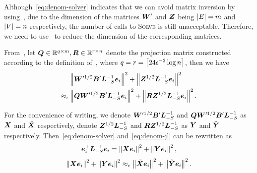 \documentclass[sigconf]{acmart}
\begin{document}
Although~\eqref{eq:denom-solver} indicates that we can avoid matrix inversion by using~, due to the dimension of the matrices \(\boldsymbol{W}'\) and \(\boldsymbol{Z}\) being \(\left|E \right|=m\) and \(\left|V \right|=n\) respectively, the number of calls to \textsc{Solve} is still unacceptable.
Therefore, we need to use~ to reduce the dimension of the corresponding matrices.

From~, let \(\boldsymbol{Q}\in\mathbb{R}^{q\times m},\boldsymbol{R}\in\mathbb{R}^{r\times n}\) denote the projection matrix constructed according to the definition of~, where \(q=r=\left\lceil24\epsilon^{-2}\log n\right\rceil\), then we have
\begin{equation}\label{eq:denom-jl}
  \begin{split}
    &\left\Vert\boldsymbol{W}'^{1/2}\boldsymbol{B}'\boldsymbol{L}_{-S}^{-1}\boldsymbol{e}_i\right\Vert^2+\left\Vert\boldsymbol{Z}^{1/2}\boldsymbol{L}_{-S}^{-1}\boldsymbol{e}_i\right\Vert^2\\
    \approx_\epsilon&\left\Vert\boldsymbol{Q}\boldsymbol{W}'^{1/2}\boldsymbol{B}'\boldsymbol{L}_{-S}^{-1}\boldsymbol{e}_i\right\Vert^2+\left\Vert\boldsymbol{R}\boldsymbol{Z}^{1/2}\boldsymbol{L}_{-S}^{-1}\boldsymbol{e}_i\right\Vert^2.
  \end{split}
\end{equation}

For the convenience of writing, we denote \(\boldsymbol{W}'^{1/2}\boldsymbol{B}'\boldsymbol{L}_{-S}^{-1}\) and \(\boldsymbol{Q}\boldsymbol{W}'^{1/2}\boldsymbol{B}'\boldsymbol{L}_{-S}^{-1}\) as \(\boldsymbol{X}\) and \(\tilde{\boldsymbol{X}}\) respectively, denote \(\boldsymbol{Z}^{1/2}\boldsymbol{L}_{-S}^{-1}\) and \(\boldsymbol{R}\boldsymbol{Z}^{1/2}\boldsymbol{L}_{-S}^{-1}\) as \(\boldsymbol{Y}\) and \(\tilde{\boldsymbol{Y}}\) respectively.
Then~\eqref{eq:denom-solver} and~\eqref{eq:denom-jl} can be rewritten as
\begin{equation}\label{eq:denom-solver-simp}
  \boldsymbol{e}_i^\top\boldsymbol{L}_{-S}^{-1}\boldsymbol{e}_i=\left\Vert\boldsymbol{X}\boldsymbol{e}_i\right\Vert^2+\left\Vert\boldsymbol{Y}\boldsymbol{e}_i\right\Vert^2,
\end{equation}
\begin{equation}\label{eq:denom-jl-simp}
  \left\Vert\boldsymbol{X}\boldsymbol{e}_i\right\Vert^2+\left\Vert\boldsymbol{Y}\boldsymbol{e}_i\right\Vert^2\approx_\epsilon\left\Vert\tilde{\boldsymbol{X}}\boldsymbol{e}_i\right\Vert^2+\left\Vert\tilde{\boldsymbol{Y}}\boldsymbol{e}_i\right\Vert^2.
\end{equation}
\end{document}

